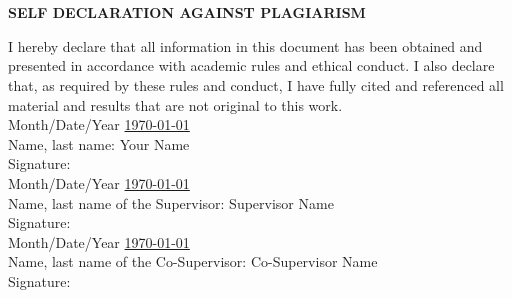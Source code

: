 \chapter*{}
\vspace*{-1.0cm}
\begin{center}
\normalfont\LARGE\textbf{SELF DECLARATION AGAINST PLAGIARISM}
\end{center}
I hereby declare that all information in this document has been obtained and presented in accordance with academic rules and ethical conduct. I also declare that, as required by these rules and conduct, I have fully cited and referenced all material and results that are not original to this work.\\[0.3cm]
\noindent
Month/Date/Year \underline{\mydate \today}\\
Name, last name: Your Name
\\[2.5cm]
Signature: \underline{\hspace*{5cm}}\\[0.4cm]
Month/Date/Year \underline{\mydate \today}\\
Name, last name of the Supervisor: Supervisor Name
\\[2.5cm]
Signature: \underline{\hspace*{5cm}}\\[0.4cm]
Month/Date/Year \underline{\mydate \today}\\
Name, last name of the Co-Supervisor: Co-Supervisor Name
\\[2.5cm]
Signature: \underline{\hspace*{5cm}}